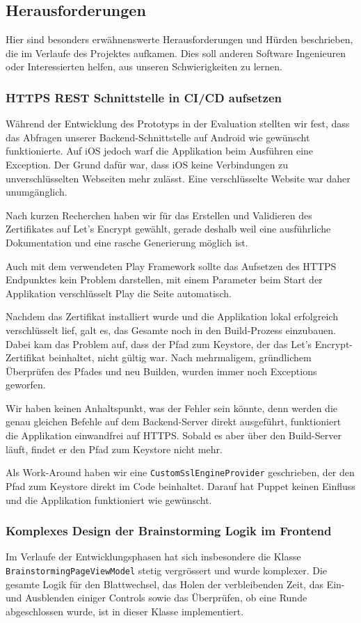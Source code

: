 \subsection{Herausforderungen}
Hier sind besonders erwähnenswerte Herausforderungen und Hürden beschrieben, die im Verlaufe des Projektes aufkamen. Dies soll anderen Software Ingenieuren oder Interessierten helfen, aus unseren Schwierigkeiten zu lernen. 

\subsubsection{HTTPS REST Schnittstelle in CI/CD aufsetzen}
Während der Entwicklung des Prototyps in der Evaluation stellten wir fest, dass das Abfragen unserer Backend-Schnittstelle auf Android wie gewünscht funktionierte. Auf iOS jedoch warf die Applikation beim Ausführen eine Exception. Der Grund dafür war, dass iOS keine Verbindungen zu unverschlüsselten Webseiten mehr zulässt. Eine verschlüsselte Website war daher unumgänglich.

Nach kurzen Recherchen haben wir für das Erstellen und Validieren des Zertifikates auf Let's Encrypt \cite{letsencrypt} gewählt, gerade deshalb weil eine ausführliche Dokumentation und eine rasche Generierung möglich ist. 

Auch mit dem verwendeten Play Framework sollte das Aufsetzen des HTTPS Endpunktes kein Problem darstellen, mit einem Parameter beim Start der Applikation verschlüsselt Play die Seite automatisch.

Nachdem das Zertifikat installiert wurde und die Applikation lokal erfolgreich verschlüsselt lief, galt es, das Gesamte noch in den Build-Prozess einzubauen. Dabei kam das Problem auf, dass der Pfad zum Keystore, der das Let's Encrypt-Zertifikat beinhaltet, nicht gültig war. Nach mehrmaligem, gründlichem Überprüfen des Pfades und neu Builden, wurden immer noch Exceptions geworfen.

Wir haben keinen Anhaltspunkt, was der Fehler sein könnte, denn werden die genau gleichen Befehle auf dem Backend-Server direkt ausgeführt, funktioniert die Applikation einwandfrei auf HTTPS. Sobald es aber über den Build-Server läuft, findet er den Pfad zum Keystore nicht mehr.

Als Work-Around haben wir eine \texttt{CustomSslEngineProvider} geschrieben, der den Pfad zum Keystore direkt im Code beinhaltet. Darauf hat Puppet keinen Einfluss und die Applikation funktioniert wie gewünscht.

\subsubsection{Komplexes Design der Brainstorming Logik im Frontend}\label{subsub:design-issue}
Im Verlaufe der Entwicklungsphasen hat sich insbesondere die Klasse \texttt{Brain\-storming\-PageViewModel} stetig vergrössert und wurde komplexer. Die gesamte Logik für den Blattwechsel, das Holen der verbleibenden Zeit, das Ein- und Ausblenden einiger Controls sowie das Überprüfen, ob eine Runde abgeschlossen wurde, ist in dieser Klasse implementiert. 

